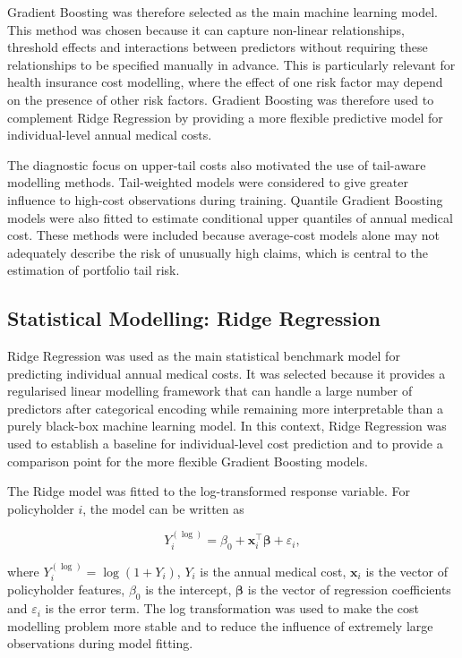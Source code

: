 \documentclass[11pt]{article}
\begin{document}
	Gradient Boosting was therefore selected as the main machine learning model. This method was chosen because it can capture non-linear relationships, threshold effects and interactions between predictors without requiring these relationships to be specified manually in advance. This is particularly relevant for health insurance cost modelling, where the effect of one risk factor may depend on the presence of other risk factors. Gradient Boosting was therefore used to complement Ridge Regression by providing a more flexible predictive model for individual-level annual medical costs.
	
	The diagnostic focus on upper-tail costs also motivated the use of tail-aware modelling methods. Tail-weighted models were considered to give greater influence to high-cost observations during training. Quantile Gradient Boosting models were also fitted to estimate conditional upper quantiles of annual medical cost. These methods were included because average-cost models alone may not adequately describe the risk of unusually high claims, which is central to the estimation of portfolio tail risk.
	
	\subsection{Statistical Modelling: Ridge Regression}
	
	Ridge Regression was used as the main statistical benchmark model for predicting individual annual medical costs. It was selected because it provides a regularised linear modelling framework that can handle a large number of predictors after categorical encoding while remaining more interpretable than a purely black-box machine learning model. In this context, Ridge Regression was used to establish a baseline for individual-level cost prediction and to provide a comparison point for the more flexible Gradient Boosting models.
	
	The Ridge model was fitted to the log-transformed response variable. For policyholder \(i\), the model can be written as
	
	\begin{equation}
		Y_i^{(\log)} = \beta_0 + \mathbf{x}_i^{\top}\boldsymbol{\beta} + \varepsilon_i,
	\end{equation}
	
	where \(Y_i^{(\log)} = \log(1 + Y_i)\), \(Y_i\) is the annual medical cost, \(\mathbf{x}_i\) is the vector of policyholder features, \(\beta_0\) is the intercept, \(\boldsymbol{\beta}\) is the vector of regression coefficients and \(\varepsilon_i\) is the error term. The log transformation was used to make the cost modelling problem more stable and to reduce the influence of extremely large observations during model fitting.
	
\end{document}
